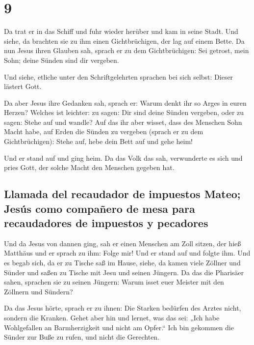 \hypertarget{section-8}{%
\section{9}\label{section-8}}

 Da trat er in das Schiff und fuhr wieder herüber und kam
in seine Stadt.  Und siehe, da brachten sie zu ihm einen
Gichtbrüchigen, der lag auf einem Bette. Da nun Jesus ihren Glauben sah,
sprach er zu dem Gichtbrüchigen: Sei getrost, mein Sohn; deine Sünden
sind dir vergeben.

 Und siehe, etliche unter den Schriftgelehrten sprachen
bei sich selbst: Dieser lästert Gott.

 Da aber Jesus ihre Gedanken sah, sprach er: Warum denkt
ihr so Arges in euren Herzen?  Welches ist leichter: zu
sagen: Dir sind deine Sünden vergeben, oder zu sagen: Stehe auf und
wandle?  Auf das ihr aber wisset, dass des Menschen Sohn
Macht habe, auf Erden die Sünden zu vergeben (sprach er zu dem
Gichtbrüchigen): Stehe auf, hebe dein Bett auf und gehe heim!

 Und er stand auf und ging heim.  Da das
Volk das sah, verwunderte es sich und pries Gott, der solche Macht den
Menschen gegeben hat.

\hypertarget{llamada-del-recaudador-de-impuestos-mateo-jesuxfas-como-compauxf1ero-de-mesa-para-recaudadores-de-impuestos-y-pecadores}{%
\subsection{Llamada del recaudador de impuestos Mateo; Jesús como
compañero de mesa para recaudadores de impuestos y
pecadores}\label{llamada-del-recaudador-de-impuestos-mateo-jesuxfas-como-compauxf1ero-de-mesa-para-recaudadores-de-impuestos-y-pecadores}}

 Und da Jesus von dannen ging, sah er einen Menschen am
Zoll sitzen, der hieß Matthäus und er sprach zu ihm: Folge mir! Und er
stand auf und folgte ihm.  Und es begab sich, da er zu
Tische saß im Hause, siehe, da kamen viele Zöllner und Sünder und saßen
zu Tische mit Jesu und seinen Jüngern.  Da das die
Pharisäer sahen, sprachen sie zu seinen Jüngern: Warum isset euer
Meister mit den Zöllnern und Sündern?

 Da das Jesus hörte, sprach er zu ihnen: Die Starken
bedürfen des Arztes nicht, sondern die Kranken.  Gehet
aber hin und lernet, was das sei: „Ich habe Wohlgefallen an
Barmherzigkeit und nicht am Opfer.`` Ich bin gekommen die Sünder zur
Buße zu rufen, und nicht die Gerechten.

